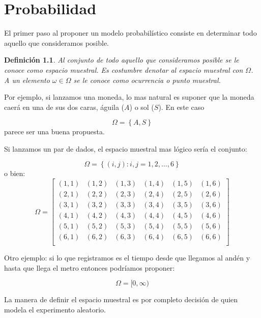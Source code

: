 \documentclass{extreport}
\theoremstyle{definicion}
\newtheorem{definition}{Definición}[chapter]
\theoremstyle{propiedad}
\theoremstyle{teorema}
\begin{document}
\chapter{Probabilidad} 
    

El primer paso al proponer un modelo probabilístico consiste en determinar todo aquello que consideramos posible. 

\begin{definition}
Al conjunto de todo aquello que consideramos \emph{posible} se le conoce  como \emph{espacio muestral}. Es costumbre denotar al espacio muestral con $\Omega$. A un elemento $\omega \in \Omega$ se le conoce como \emph{ocurrencia} o \emph{punto muestral}.
\end{definition}

Por ejemplo, si lanzamos una moneda, lo mas natural es suponer que la moneda caerá en una de sus dos caras, águila ($A$) o sol ($S$). En este caso 

$$
\Omega =\left\{A, S\right\} 
$$
parece ser una buena propuesta. 

Si lanzamos un par de dados, el espacio muestral mas lógico sería el conjunto:

$$
\Omega = \left\{(i, j): i, j = 1,2,\ldots,6\right\}
$$
o bien:
$$
\Omega = \left[
\begin{matrix}
(1,1) & (1,2) & (1,3) & (1,4) & (1,5) & (1,6) \\

(2,1) & (2,2) & (2,3) & (2,4) & (2,5) & (2,6) \\

(3,1) & (3,2) & (3,3) & (3,4) & (3,5) & (3,6) \\

(4,1) & (4,2) & (4,3) & (4,4) & (4,5) & (4,6) \\

(5,1) & (5,2) & (5,3) & (5,4) & (5,5) & (5,6) \\

(6,1) & (6,2) & (6,3) & (6,4) & (6,5) & (6,6) \\

\end{matrix}
\right]
$$

Otro ejemplo: si lo que registramos es el tiempo desde que llegamos al andén y hasta que llega el metro entonces podríamos proponer:

$$
\Omega = [0,\infty)
$$

La manera de definir el espacio muestral es por completo decisión de quien modela el experimento aleatorio.  
\end{document}
